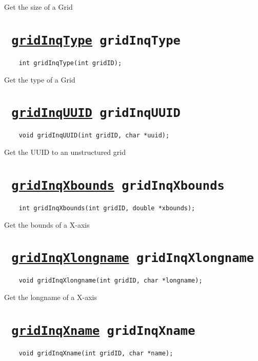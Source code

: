 Get the size of a Grid
\ifpdfoutput{}{(\ref{gridInqSize})}


\section*{\tt 
\ifpdf
\hyperref[gridInqType]{gridInqType}
\else
gridInqType
\fi
}
\begin{verbatim}
    int gridInqType(int gridID);
\end{verbatim}

Get the type of a Grid
\ifpdfoutput{}{(\ref{gridInqType})}


\section*{\tt 
\ifpdf
\hyperref[gridInqUUID]{gridInqUUID}
\else
gridInqUUID
\fi
}
\begin{verbatim}
    void gridInqUUID(int gridID, char *uuid);
\end{verbatim}

Get the UUID to an unstructured grid
\ifpdfoutput{}{(\ref{gridInqUUID})}


\section*{\tt 
\ifpdf
\hyperref[gridInqXbounds]{gridInqXbounds}
\else
gridInqXbounds
\fi
}
\begin{verbatim}
    int gridInqXbounds(int gridID, double *xbounds);
\end{verbatim}

Get the bounds of a X-axis
\ifpdfoutput{}{(\ref{gridInqXbounds})}


\section*{\tt 
\ifpdf
\hyperref[gridInqXlongname]{gridInqXlongname}
\else
gridInqXlongname
\fi
}
\begin{verbatim}
    void gridInqXlongname(int gridID, char *longname);
\end{verbatim}

Get the longname of a X-axis
\ifpdfoutput{}{(\ref{gridInqXlongname})}


\section*{\tt 
\ifpdf
\hyperref[gridInqXname]{gridInqXname}
\else
gridInqXname
\fi
}
\begin{verbatim}
    void gridInqXname(int gridID, char *name);
\end{verbatim}

